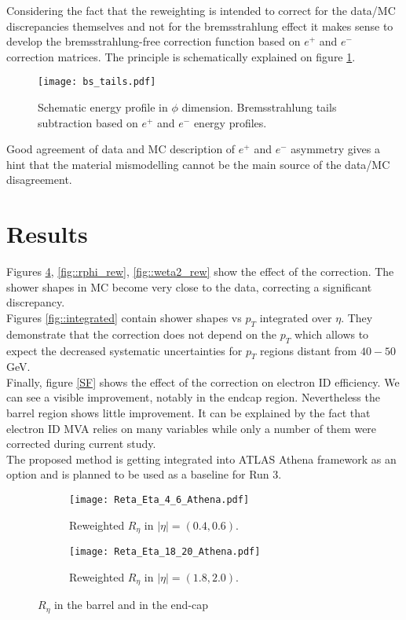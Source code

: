   
  Considering the fact that the reweighting is intended to correct for the data/MC discrepancies themselves and not for the bremsstrahlung effect it makes sense to develop the bremsstrahlung-free correction function based on $e^+$ and $e^-$ correction matrices. The principle is schematically explained on figure \ref{bstails}.\\
  \begin{figure}[htbp]
  	\begin{center}\texttt{[image: bs\_tails.pdf]}\end{center}
  	\caption{Schematic energy profile in $\phi$ dimension. Bremsstrahlung tails subtraction based on $e^+$ and $e^-$ energy profiles.}
  	\label{bstails}
  \end{figure}
  Good agreement of data and MC description of $e^+$ and $e^-$ asymmetry gives a hint that the material mismodelling cannot be the main source of the data/MC disagreement.\\
  
  \section{Results}
  Figures \ref{fig::reta}, \ref{fig::rphi_rew}, \ref{fig::weta2_rew} show the effect of the correction. The shower shapes in MC become very close to the data, correcting a significant discrepancy. \\
  Figures \ref{fig::integrated} contain shower shapes vs $p_T$ integrated over $\eta$. They demonstrate that the correction does not depend on the $p_T$ which allows to expect the decreased systematic uncertainties for $p_T$ regions distant from $40-50$GeV.\\
  Finally, figure \ref{SF} shows the effect of the correction on electron ID efficiency. We can see a visible improvement, notably in the endcap region.
  Nevertheless the barrel region shows little improvement. It can be explained by the fact that electron ID MVA relies on many variables while only a number of them were corrected during current study.\\
  The proposed method is getting integrated into ATLAS Athena framework as an option and is planned to be used as a baseline for Run 3. 
  
  	\begin{figure}[htbp]
  	\begin{subfigure}[t]{0.5\textwidth}
  		\texttt{[image: Reta\_Eta\_4\_6\_Athena.pdf]}
  		\caption{Reweighted  $R_{\eta }$ in $|\eta| = (0.4,0.6)$.  }
  		\label{fig::id}
  	\end{subfigure}
  	\hfill
  	\begin{subfigure}[t]{0.5\textwidth} 
  		\texttt{[image: Reta\_Eta\_18\_20\_Athena.pdf]}
  		\caption{Reweighted  $R_{\eta }$ in $|\eta| = (1.8,2.0)$.  }
  		\label{fig::pd}
  	\end{subfigure}
  	\caption{$R_{\eta }$  in the barrel and in the end-cap}
  	\label{fig::reta}
  \end{figure}
 
